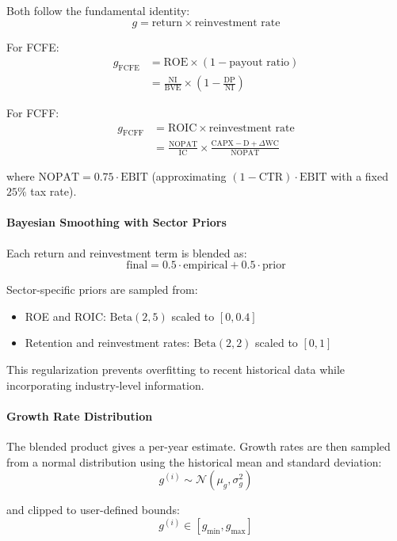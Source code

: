 Both follow the fundamental identity:
\[
g = \text{return} \times \text{reinvestment rate}
\]

For FCFE:
\begin{align*}
g_{\text{FCFE}} &= \text{ROE} \times (1 - \text{payout ratio}) \\
&= \frac{\text{NI}}{\text{BVE}} \times \left(1 - \frac{\text{DP}}{\text{NI}}\right)
\end{align*}

For FCFF:
\begin{align*}
g_{\text{FCFF}} &= \text{ROIC} \times \text{reinvestment rate} \\
&= \frac{\text{NOPAT}}{\text{IC}} \times \frac{\text{CAPX} - \text{D} + \Delta \text{WC}}{\text{NOPAT}}
\end{align*}

where $\text{NOPAT} = 0.75 \cdot \text{EBIT}$ (approximating $(1 - \text{CTR}) \cdot \text{EBIT}$ with a fixed $25\%$ tax rate).

\paragraph{Bayesian Smoothing with Sector Priors}

Each return and reinvestment term is blended as:
\[
\text{final} = 0.5 \cdot \text{empirical} + 0.5 \cdot \text{prior}
\]

Sector-specific priors are sampled from:
\begin{itemize}
  \item ROE and ROIC: $\text{Beta}(2, 5)$ scaled to $[0, 0.4]$
  \item Retention and reinvestment rates: $\text{Beta}(2, 2)$ scaled to $[0, 1]$
\end{itemize}

This regularization prevents overfitting to recent historical data while incorporating industry-level information.

\paragraph{Growth Rate Distribution}

The blended product gives a per-year estimate. Growth rates are then sampled from a normal distribution using the historical mean and standard deviation:
\[
g^{(i)} \sim \mathcal{N}(\mu_g, \sigma_g^2)
\]

and clipped to user-defined bounds:
\[
g^{(i)} \in [g_{\min}, g_{\max}]
\]

